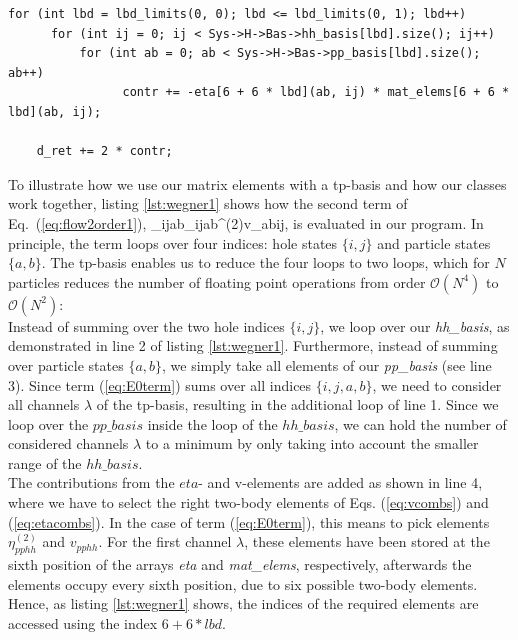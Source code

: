 \begin{lstlisting}[float, caption={Excerpt of the function \textit{E0\_deriv:}, which evaluates Eq.~(\ref{eq:flow2order1}). Here the second term of Eq.~(\ref{eq:flow2order1}) is demonstrated. For detailed explanation, see text.},label={lst:wegner1}]
for (int lbd = lbd_limits(0, 0); lbd <= lbd_limits(0, 1); lbd++)
      for (int ij = 0; ij < Sys->H->Bas->hh_basis[lbd].size(); ij++)
          for (int ab = 0; ab < Sys->H->Bas->pp_basis[lbd].size(); ab++)
                contr += -eta[6 + 6 * lbd](ab, ij) * mat_elems[6 + 6 * lbd](ab, ij);

    d_ret += 2 * contr;
\end{lstlisting}

To illustrate how we use our matrix elements with a tp-basis and how our classes work together, listing \ref{lst:wegner1} shows how the second term of Eq.~(\ref{eq:flow2order1}),
\be
{}\sum_{ijab}\eta_{ijab}^{(2)}v_{abij},
\label{eq:E0term}
\ee
is evaluated in our program. In principle, the term loops over four indices: hole states $ \lbrace i,j \rbrace$ and particle states $\lbrace a,b \rbrace$. The tp-basis enables us to reduce the four loops to two loops, which for $N$ particles reduces the number of floating point operations from order $\mathcal{O}(N^4)$ to $\mathcal{O}(N^2)$: \\
Instead of summing over the two hole indices $\lbrace i,j \rbrace$, we loop over our \textit{hh\_basis}, as demonstrated in line 2 of listing \ref{lst:wegner1}. Furthermore, instead of summing over particle states $\lbrace a,b\rbrace $, we simply take all elements of our \textit{pp\_basis} (see line 3). Since term (\ref{eq:E0term}) sums over all indices $\lbrace i,j,a,b\rbrace$, we need to consider all channels $\lambda$ of the tp-basis, resulting in the additional loop of line 1. Since we loop over the $pp\_basis$ inside the loop of the $hh\_basis$, we can hold the number of considered channels $\lambda$ to a minimum by only taking into account the smaller range of the $hh\_basis$. \\
The contributions from the $eta$- and v-elements are added as shown in line 4, where we have to select the right two-body elements of Eqs. (\ref{eq:vcombs}) and (\ref{eq:etacombs}). In the case of term (\ref{eq:E0term}), this means to pick elements $\eta_{pphh}^{(2)}$ and $v_{pphh}$. For the first channel $\lambda$, these elements have been stored at the sixth position of the arrays \textit{eta} and \textit{mat\_elems}, respectively, afterwards the elements occupy every sixth position, due to six possible two-body elements. Hence, as listing \ref{lst:wegner1} shows, the indices of the required elements are accessed using the index $6+6*lbd$. 

